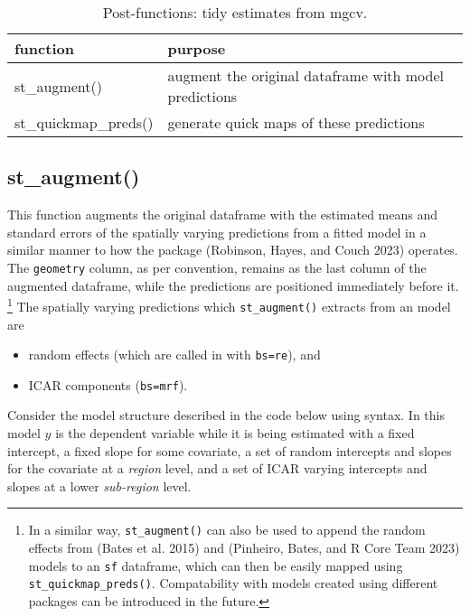 \begin{table}

\caption{\label{tab:postfunc-latex}Post-functions: tidy estimates from mgcv.}
\centering
\fontsize{9}{11}\selectfont
\begin{tabular}[t]{l|l}
\hline
\textbf{function} & \textbf{purpose}\\
\hline
st\_augment() & augment the original dataframe with model predictions\\
\hline
st\_quickmap\_preds() & generate quick maps of these predictions\\
\hline
\end{tabular}
\end{table}

\hypertarget{st_augment}{%
\subsection{st\_augment()}\label{st_augment}}

This function augments the original dataframe with the estimated means
and standard errors of the spatially varying predictions from a fitted  model in a similar manner to
how the  package (Robinson, Hayes, and Couch 2023) operates. The \texttt{geometry} column, as per convention, remains as the last column of the augmented dataframe, while the predictions are positioned immediately before it. \footnote{In a similar way, \texttt{st\_augment()} can also be used to append the random effects from  (Bates et al. 2015) and  (Pinheiro, Bates, and R Core Team 2023) models to an \texttt{sf} dataframe, which can then be easily mapped using \texttt{st\_quickmap\_preds()}. Compatability with models created using different packages can be introduced in the future.} The spatially varying predictions which \texttt{st\_augment()} extracts from an  model are

\begin{itemize}
\tightlist
\item
  random effects (which are called in  with \texttt{bs=\textquotesingle{}re\textquotesingle{}}), and
\item
  ICAR components (\texttt{bs=\textquotesingle{}mrf\textquotesingle{}}).
\end{itemize}

Consider the model structure described in the code below using  syntax. In this model \(y\) is the dependent variable while it is being estimated with a fixed intercept, a fixed slope for some covariate, a set of random intercepts and slopes for the covariate at a \emph{region} level, and a set of ICAR varying intercepts and slopes at a lower \emph{sub-region} level.

